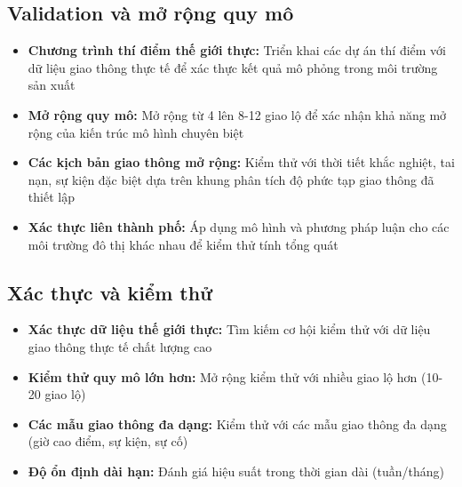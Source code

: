 \subsection{Validation và mở rộng quy mô}
\begin{itemize}
    \item \textbf{Chương trình thí điểm thế giới thực:} Triển khai các dự án thí điểm với
        dữ liệu giao thông thực tế để xác thực kết quả mô phỏng trong môi trường sản xuất

    \item \textbf{Mở rộng quy mô:} Mở rộng từ 4 lên 8-12 giao lộ để xác nhận
        khả năng mở rộng của kiến trúc mô hình chuyên biệt

    \item \textbf{Các kịch bản giao thông mở rộng:} Kiểm thử với thời tiết khắc nghiệt, tai nạn,
        sự kiện đặc biệt dựa trên khung phân tích độ phức tạp giao thông đã thiết lập

    \item \textbf{Xác thực liên thành phố:} Áp dụng mô hình và phương pháp luận cho
        các môi trường đô thị khác nhau để kiểm thử tính tổng quát
\end{itemize}

\subsection{Xác thực và kiểm thử}
\begin{itemize}
    \item \textbf{Xác thực dữ liệu thế giới thực:} Tìm kiếm cơ hội kiểm thử với dữ liệu
        giao thông thực tế chất lượng cao

    \item \textbf{Kiểm thử quy mô lớn hơn:} Mở rộng kiểm thử với nhiều giao lộ hơn
        (10-20 giao lộ)

    \item \textbf{Các mẫu giao thông đa dạng:} Kiểm thử với các mẫu giao thông đa
        dạng (giờ cao điểm, sự kiện, sự cố)

    \item \textbf{Độ ổn định dài hạn:} Đánh giá hiệu suất trong thời gian dài (tuần/tháng)
\end{itemize}


